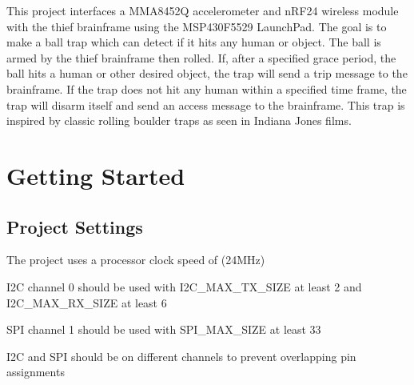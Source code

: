 

 This project interfaces a M\+M\+A8452Q accelerometer and n\+R\+F24 wireless module with the thief brainframe using the M\+S\+P430\+F5529 Launch\+Pad. The goal is to make a ball trap which can detect if it hits any human or object. The ball is armed by the thief brainframe then rolled. If, after a specified grace period, the ball hits a human or other desired object, the trap will send a trip message to the brainframe. If the trap does not hit any human within a specified time frame, the trap will disarm itself and send an access message to the brainframe. This trap is inspired by classic rolling boulder traps as seen in Indiana Jones films.\hypertarget{index_getting_started}{}\section{Getting Started}\label{index_getting_started}
\hypertarget{index_project_settings}{}\subsection{Project Settings}\label{index_project_settings}

\begin{DoxyItemize}
\item The project uses a processor clock speed of (24M\+Hz)
\item I2C channel 0 should be used with I2\+C\+\_\+\+M\+A\+X\+\_\+\+T\+X\+\_\+\+S\+I\+ZE at least 2 and I2\+C\+\_\+\+M\+A\+X\+\_\+\+R\+X\+\_\+\+S\+I\+ZE at least 6
\item S\+PI channel 1 should be used with S\+P\+I\+\_\+\+M\+A\+X\+\_\+\+S\+I\+ZE at least 33
\item I2C and S\+PI should be on different channels to prevent overlapping pin assignments
\end{DoxyItemize}

